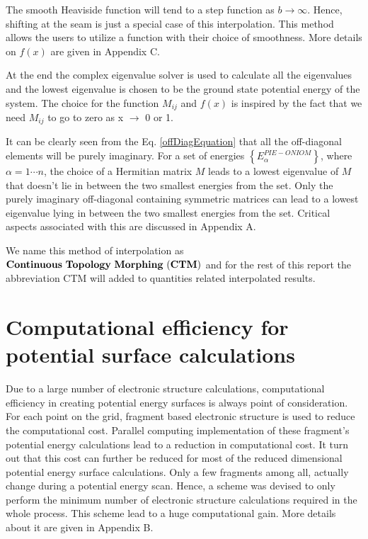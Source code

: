 The smooth Heaviside function will tend to a step function as $b \to \infty$. Hence,
shifting at the seam is just a special case of this interpolation. This method
allows the users to utilize a function with their choice of smoothness. More details on
$f(x)$ are given in Appendix C.

\noindent At the end the complex eigenvalue solver is used to calculate all the eigenvalues and
the lowest eigenvalue is chosen to be the ground state potential energy of the system. The choice
for the function $M_{ij}$ and $f(x)$ is inspired by the fact that we need $M_{ij}$ to go to zero
as x $\rightarrow$ 0 or 1.

It can be clearly seen from the Eq. \ref{offDiagEquation} that all the off-diagonal elements
will be purely imaginary.
For a set of energies $\left\{ E_\alpha^{PIE-ONIOM} \right\}$, where
$\alpha = 1 \cdots n$, the choice of a Hermitian matrix $M$ leads to a lowest eigenvalue of $M$
that doesn't lie in between the two smallest energies from the set. Only the purely imaginary
off-diagonal containing symmetric matrices can lead to a lowest eigenvalue lying in between the
two smallest energies from the set. Critical aspects associated with this are discussed
in Appendix A.

We name this method of interpolation as $\bf{Continuous ~Topology ~Morphing ~(CTM)}$ and for the
rest of this report the abbreviation CTM will added to quantities related interpolated results.


\section{Computational efficiency for potential surface calculations}
Due to a large number of electronic structure calculations, computational efficiency in creating
potential energy surfaces is always point of consideration. For each point on the grid, fragment
based electronic structure is used to reduce the computational cost. Parallel computing implementation
of these fragment's potential energy calculations lead to a reduction in computational cost. It
turn out that this cost can further be reduced for most of the reduced dimensional potential energy
surface calculations. Only a few fragments among all, actually change during a potential energy
scan. Hence, a scheme was devised to only perform the minimum number of electronic structure
calculations required in the whole process. This scheme lead to a huge computational gain. More
details about it are given in Appendix B.


